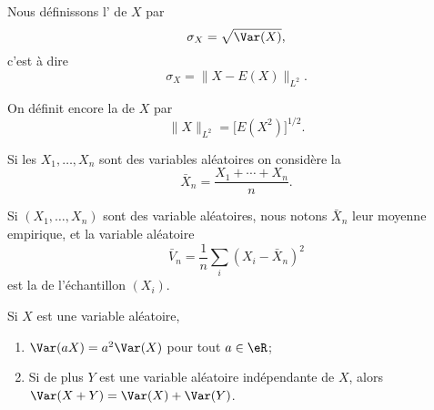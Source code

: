 \begin{definition}

	Nous définissons l' de \( X\) par
	\begin{equation}
		\sigma_X=\sqrt{\Var(X)},
	\end{equation}
	c'est à dire
	\begin{equation}
		\sigma_X=\| X-E(X) \|_{L^2}.
	\end{equation}
\end{definition}


\begin{definition}
	On définit encore la  de \( X\) par
	\begin{equation}
		\| X \|_{L^2}=\big[ E(X^2) \big]^{1/2}.
	\end{equation}
\end{definition}

\begin{definition}
	Si les \( X_1,\ldots,X_n\) sont des variables aléatoires on considère la 
	\begin{equation}
		\bar X_n=\frac{ X_1+\cdots+X_n }{ n }.
	\end{equation}
\end{definition}

\begin{definition}
	Si \( (X_1,\ldots,X_n)\) sont des variable aléatoires, nous notons \( \bar X_n\) leur moyenne empirique, et la variable aléatoire
	\begin{equation}
		\bar V_n=\frac{1}{ n }\sum_i(X_i-\bar X_n)^2
	\end{equation}
	est la  de l'échantillon \( (X_i)\).
\end{definition}

\begin{lemma}       \label{LemEXYEXEYindep}
	Si \( X\) est une variable aléatoire,
	\begin{enumerate}
		\item
		      \( \Var(aX)=a^2\Var(X)\) pour tout \( a\in\eR\);
		\item
		      Si de plus \( Y\) est une variable aléatoire indépendante de \( X\), alors \( \Var(X+Y)=\Var(X)+\Var(Y)\).
	\end{enumerate}
\end{lemma}

